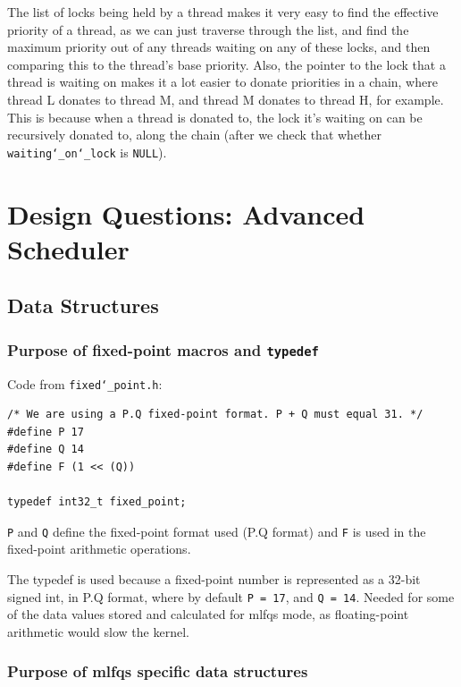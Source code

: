 \documentclass{article}
\renewcommand{\_}{\char`_}
\begin{document}
The list of locks being held by a thread makes it very easy to find the effective priority of a thread, as we can just traverse through the list, and find the maximum priority out of any threads waiting on any of these locks, and then comparing this to the thread's base priority. Also, the pointer to the lock that a thread is waiting on makes it a lot easier to donate priorities in a chain, where thread L donates to thread M, and thread M donates to thread H, for example. This is because when a thread is donated to, the lock it's waiting on can be recursively donated to, along the chain (after we check that whether \texttt{waiting\_on\_lock} is \texttt{NULL}).

\newpage

\section{Design Questions: Advanced Scheduler}
\subsection{Data Structures}
\subsubsection{Purpose of fixed-point macros and \texttt{typedef}}

Code from \texttt{fixed\_point.h}: 

\begin{lstlisting}
/* We are using a P.Q fixed-point format. P + Q must equal 31. */
#define P 17
#define Q 14
#define F (1 << (Q))

typedef int32_t fixed_point;

\end{lstlisting}

\texttt{P} and \texttt{Q} define the fixed-point format used (P.Q format) and \texttt{F} is used in the fixed-point arithmetic operations.

The typedef is used because a fixed-point number is represented as a 32-bit signed int, in P.Q format, where by default \texttt{P = 17}, and \texttt{Q = 14}. Needed for some of the data values stored and calculated for mlfqs mode, as floating-point arithmetic would slow the kernel.

\subsubsection{Purpose of mlfqs specific data structures}
\end{document}
